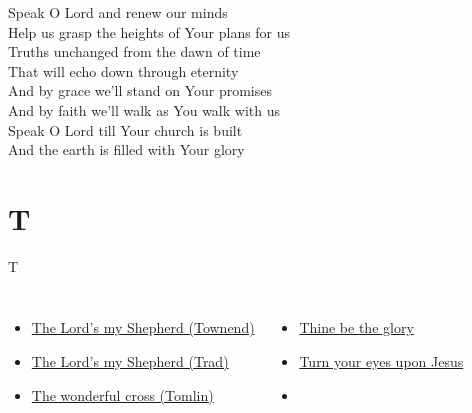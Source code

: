 \documentclass{beamer}
\begin{document}
{\begin{frame}{}
\end{frame}

\hypertarget{Speak O Lord[](Getty/Townend)3}{}
\begin{frame}{}
\fontsize{ 15 }{ 19 }\selectfont

Speak O Lord and renew our minds\\ 
Help us grasp the heights of Your plans for us\\ 
Truths unchanged from the dawn of time\\ 
That will echo down through eternity\\ 
And by grace we'll stand on Your promises\\ 
And by faith we'll walk as You walk with us\\ 
Speak O Lord till Your church is built\\ 
And the earth is filled with Your glory 

\end{frame}

}
\section{T}

\begin{frame}[t]{T}
\begin{columns}[t]
        \begin{itemize}
    \item \hyperlink{The Lord's my Shepherd['Psalm 23'](Townend)}{The Lord's my Shepherd (Townend)} \phantom{ 1 1}
            \item \hyperlink{The Lord's my Shepherd['Psalm 23'](Trad)}{The Lord's my Shepherd (Trad)} \phantom{ 1 1 1}
                    \item \hyperlink{The wonderful cross['When I survey'](Tomlin)}{The wonderful cross (Tomlin)} \phantom{ 1 1 1 1}
\end{itemize}
        \begin{itemize}
            \item \hyperlink{Thine be the glory[]}{Thine be the glory } \phantom{ 1 1 1 1 1 1 1 1}
    \item \hyperlink{Turn your eyes upon Jesus[]}{Turn your eyes upon Jesus } \phantom{ 1 1 1 1 1}
    \item[] \phantom{1}\end{itemize}


\end{columns}

\end{frame}
\end{document}
